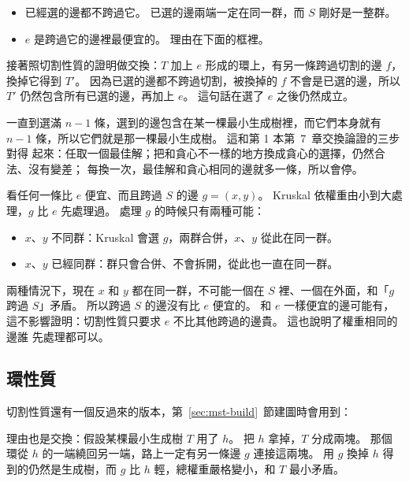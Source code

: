 \begin{itemize}
\item 已經選的邊都不跨過它。 已選的邊兩端一定在同一群，而 $S$ 剛好是一整群。
\item $e$ 是跨過它的邊裡最便宜的。 理由在下面的框裡。
\end{itemize}

接著照切割性質的證明做交換：$T$ 加上 $e$ 形成的環上，有另一條跨過切割的邊 $f$，
換掉它得到 $T'$。 因為已選的邊都不跨過切割，被換掉的 $f$ 不會是已選的邊，所以
$T'$ 仍然包含所有已選的邊，再加上 $e$。 這句話在選了 $e$ 之後仍然成立。

一直到選滿 $n - 1$ 條，選到的邊包含在某一棵最小生成樹裡，而它們本身就有
$n - 1$ 條，所以它們就是那一棵最小生成樹。 這和第 1 本第~7~章交換論證的三步對得
起來：任取一個最佳解；把和貪心不一樣的地方換成貪心的選擇，仍然合法、沒有變差；
每換一次，最佳解和貪心相同的邊就多一條，所以會停。

\begin{whybox}
看任何一條比 $e$ 便宜、而且跨過 $S$ 的邊 $g = (x, y)$。 Kruskal 依權重由小到大處
理，$g$ 比 $e$ 先處理過。 處理 $g$ 的時候只有兩種可能：

\begin{itemize}
\item $x$、$y$ 不同群：Kruskal 會選 $g$，兩群合併，$x$、$y$ 從此在同一群。
\item $x$、$y$ 已經同群：群只會合併、不會拆開，從此也一直在同一群。
\end{itemize}

兩種情況下，現在 $x$ 和 $y$ 都在同一群，不可能一個在 $S$ 裡、一個在外面，和「$g$
跨過 $S$」矛盾。 所以跨過 $S$ 的邊沒有比 $e$ 便宜的。 和 $e$ 一樣便宜的邊可能有，
這不影響證明：切割性質只要求 $e$ 不比其他跨過的邊貴。 這也說明了權重相同的邊誰
先處理都可以。
\end{whybox}

\subsection{環性質}

切割性質還有一個反過來的版本，第~\ref{sec:mst-build}~節建圖時會用到：

\begin{center}
\end{center}

理由也是交換：假設某棵最小生成樹 $T$ 用了 $h$。 把 $h$ 拿掉，$T$ 分成兩塊。 那個
環從 $h$ 的一端繞回另一端，路上一定有另一條邊 $g$ 連接這兩塊。 用 $g$ 換掉 $h$ 得
到的仍然是生成樹，而 $g$ 比 $h$ 輕，總權重嚴格變小，和 $T$ 最小矛盾。

